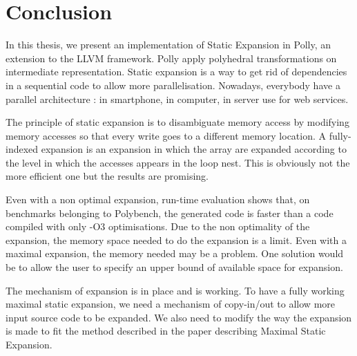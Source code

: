 \chapter*{Conclusion}\label{ch:Conclusion}

In this thesis, we present an implementation of Static Expansion in Polly, an extension to the LLVM framework. Polly apply polyhedral transformations on intermediate representation. Static expansion is a way to get rid of dependencies in a sequential code to allow more parallelisation. Nowadays, everybody have a parallel architecture : in smartphone, in computer, in server use for web services. 

The principle of static expansion is to disambiguate memory access by modifying memory accesses so that every write goes to a different memory location. A fully-indexed expansion is an expansion in which the array are expanded according to the level in which the accesses appears in the loop nest. This is obviously not the more efficient one but the results are promising.

Even with a non optimal expansion, run-time evaluation shows that, on benchmarks belonging to Polybench, the generated code is faster than a code compiled with only -O3 optimisations. Due to the non optimality of the expansion, the memory space needed to do the expansion is a limit. Even with a maximal expansion, the memory needed may be a problem. One solution would be to allow the user to specify an upper bound of available space for expansion.

The mechanism of expansion is in place and is working. To have a fully working maximal static expansion, we need a mechanism of copy-in/out to allow more input source code to be expanded. We also need to modify the way the expansion is made to fit the method described in the paper describing Maximal Static Expansion\cite{Polly}.